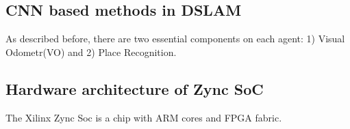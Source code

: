 \label{sec:background}
\subsection{CNN based methods in DSLAM}
As described before, there are two essential components on each agent: 1) Visual Odometr(VO) and 2) Place Recognition.

\subsection{Hardware architecture of Zync SoC}
The Xilinx Zync Soc is a chip with ARM cores and FPGA fabric.